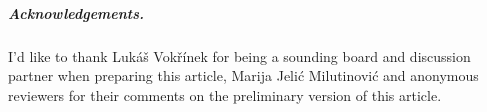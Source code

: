 \documentclass[a4paper, v2021]{lipics-v2021}
\theoremstyle{plain}
\theoremstyle{definition}
\newcommand{\AD}{\mathrm{AD}}{}
\newcommand{\Cliq}[2]{\mathsf{Cliq}_{#1}(#2)}
\begin{document}
\subparagraph*{Acknowledgements.}
I'd like to thank Lukáš Vokřínek for being a sounding board and discussion partner when preparing this article, Marija Jeli\'{c} Milutinovi\'{c} and anonymous reviewers for their comments on the preliminary version of this article.






%

\end{document}
